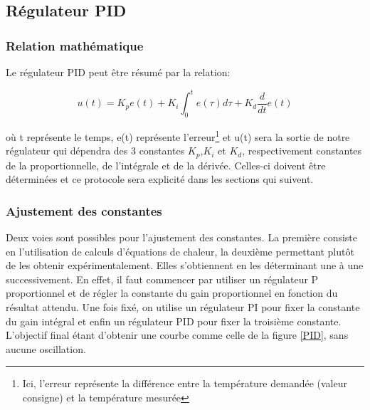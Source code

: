 \documentclass[11pt,a4paper,11pt]{report}
\begin{document}

\subsection{Régulateur PID}

\subsubsection{Relation mathématique}

Le régulateur PID peut être résumé par la relation:

\begin{equation}
\label{equation_pid}
	u(t) = K_p e(t) + K_i \int_0^t{e(\tau)d\tau} + K_d\frac{d}{dt}e(t)
\end{equation}


où t représente le temps, e(t) représente l'erreur\footnote{Ici, l'erreur représente la différence entre la température demandée (valeur consigne) et la température mesurée} et u(t) sera la sortie de notre régulateur qui dépendra des 3 constantes $K_p$,$K_i$ et $K_d$, respectivement constantes de la proportionnelle, de l'intégrale et de la dérivée. Celles-ci doivent être déterminées et ce protocole sera explicité dans les sections qui suivent.

\subsubsection{Ajustement des constantes}

Deux voies sont possibles pour l'ajustement des constantes. La première consiste en l'utilisation de calculs d'équations de chaleur, la deuxième permettant plutôt de les obtenir expérimentalement. Elles s'obtiennent en les déterminant une à une successivement. En effet, il faut commencer par utiliser un régulateur P proportionnel et de régler la constante du gain proportionnel en fonction du résultat attendu. Une fois fixé, on utilise un régulateur PI pour fixer la constante du gain intégral et enfin un régulateur PID pour fixer la troisième constante. L'objectif final étant d'obtenir une courbe comme celle de la figure \ref{PID}, sans aucune oscillation.\\
\end{document}
